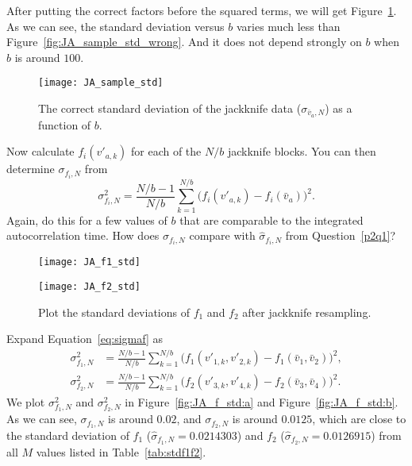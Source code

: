 After putting the correct factors before the squared terms, we will get
Figure~\ref{fig:JA_sample_std}.
As we can see, the standard deviation versus \(b\) varies much less than
Figure~\ref{fig:JA_sample_std_wrong}.
And it does not depend strongly on \(b\) when \(b\) is around \(100\).
%
\begin{figure}[hb]
    \centering
    \texttt{[image: JA\_sample\_std]}
    \caption{The correct standard deviation of the jackknife data (\(\sigma_{\bar{v}_a,N}\)) as a
        function of \(b\).}
    \label{fig:JA_sample_std}
\end{figure}


\Question{} Now calculate \(f_i(v'_{a,k})\) for each of the \(N/b\) jackknife blocks.
You can then determine \(\sigma_{f_i,N}\) from
%
\begin{equation}\label{eq:sigmaf}
    \sigma^2_{f_i,N} = \frac{ N/b - 1 }{ N/b }
    \sum_{k=1}^{N/b} \bigl( f_i(v'_{a,k}) - f_i(\bar{v}_a) \bigr)^2.
\end{equation}
%
Again, do this for a few values of \(b\) that are comparable to the integrated
autocorrelation time. How does \(\sigma_{f_i,N}\) compare with \(\hat{\sigma}_{f_i,N}\) from
Question~\ref{p2q1}?

\Answer{}
\begin{figure}
    \centering
    \begin{minipage}[t]{0.8\linewidth}
        \centering
        \texttt{[image: JA\_f1\_std]}
        \label{fig:JA_f_std:a}
    \end{minipage}
    \hfill
    \begin{minipage}[t]{0.8\linewidth}
        \centering
        \texttt{[image: JA\_f2\_std]}
        \label{fig:JA_f_std:b}
    \end{minipage}
    \caption{Plot the standard deviations of \(f_1\) and \(f_2\) after jackknife resampling.}
    \label{fig:JA_f_std}
\end{figure}
%
Expand Equation~\eqref{eq:sigmaf} as
%
\begin{align}
    \sigma^2_{f_1,N} & = \frac{ N/b - 1 }{ N/b }
    \sum_{k=1}^{N/b} \bigl( f_1(v'_{1,k}, v'_{2,k}) - f_1(\bar{v}_1, \bar{v}_2) \bigr)^2, \\
    \sigma^2_{f_2,N} & = \frac{ N/b - 1 }{ N/b }
    \sum_{k=1}^{N/b} \bigl( f_2(v'_{3,k}, v'_{4,k}) - f_2(\bar{v}_3, \bar{v}_4) \bigr)^2.
\end{align}
%
We plot \(\sigma^2_{f_1,N}\) and \(\sigma^2_{f_2,N}\) in Figure~\ref{fig:JA_f_std:a}
and Figure~\ref{fig:JA_f_std:b}.
As we can see, \(\sigma_{f_1,N}\) is around \(0.02\),
and \(\sigma_{f_2,N}\) is around \(0.0125\), which are close to the standard deviation
of \(f_1\) (\(\hat{\sigma}_{f_1,N} = 0.0214303\)) and
\(f_2\) (\(\hat{\sigma}_{f_2,N} = 0.0126915\))
from all \(M\) values listed in Table~\ref{tab:stdf1f2}.

